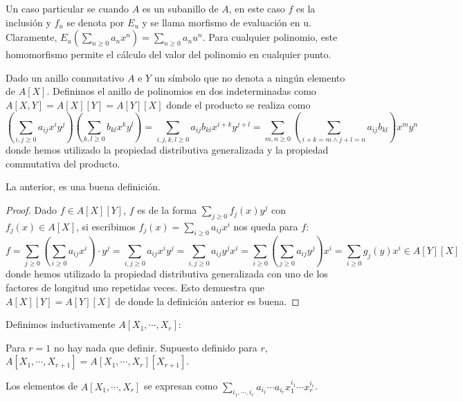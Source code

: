 Un caso particular se cuando $A$ es un subanillo de $A$, en este caso $f$ es la inclusión y $f_u$ se denota por $E_u$ y se llama morfismo de evaluación en u. Claramente, $E_u(\sum_{n \ge 0} a_n x^n) = \sum_{n \ge 0} a_n u^n$. Para cualquier polinomio, este homomorfismo permite el cálculo del valor del polinomio en cualquier punto. 

\begin{definition}
Dado un anillo conmutativo $A$ e $Y$ un símbolo que no denota a ningún elemento de $A[X]$. Definimos el anillo de polinomios en dos indeterminadas como $A[X,Y] = A[X][Y] = A[Y][X]$ donde el producto se realiza como $$(\sum_{i,j \ge 0} a_{ij}x^iy^j)(\sum_{k,l \ge 0} b_{kl}x^ky^l) = \sum_{i,j,k,l \ge 0} a_{ij}b_{kl} x^{i+k}y^{j+l} = \sum_{m,n \ge 0} (\sum_{i+k = m \land j+l = n} a_{ij}b_{kl}) x^m y^n$$ donde hemos utilizado la propiedad distributiva generalizada y la propiedad commutativa del producto. 
\end{definition}

\begin{proposition}
La anterior, es una buena definición.
\end{proposition}
\begin{proof}
Dado $f \in A[X][Y]$, $f$ es de la forma $\sum_{j \ge 0} f_j(x) y^j$ con $f_j(x) \in A[X]$, si escribimos $f_j(x) = \sum_{i \ge 0} a_{ij} x^i$ nos queda para $f$: $$f = \sum_{j \ge 0} (\sum_{i \ge 0} a_{ij} x^i) \cdot y^j = \sum_{i,j \ge 0} a_{ij} x^i y^j = \sum_{i,j \ge 0} a_{ij} y^j x^i = \sum_{i \ge 0} (\sum_{j \ge 0} a_{ij} y^j)x^i = \sum_{i \ge 0} g_j(y) x^i \in A[Y][X]$$ donde hemos utilizado la propiedad distributiva generalizada con uno de los factores de longitud uno repetidas veces. Esto demuestra que $A[X][Y] = A[Y][X]$ de donde la definición anterior es buena. 
\end{proof}

\begin{definition}
Definimos inductivamente $A[X_1,\cdots,X_r]$:

Para $r = 1$ no hay nada que definir. Supuesto definido para $r$, $A[X_1, \cdots, X_{r+1}] = A[X_1, \cdots, X_r][X_{r+1}]$.

Los elementos de $A[X_1,\cdots,X_r]$ se expresan como $\sum_{i_1,\cdots,i_r} a_{i_1}\cdots a_{i_r} x_1^{i_1} \cdots x_r^{i_r}$.
\end{definition}

